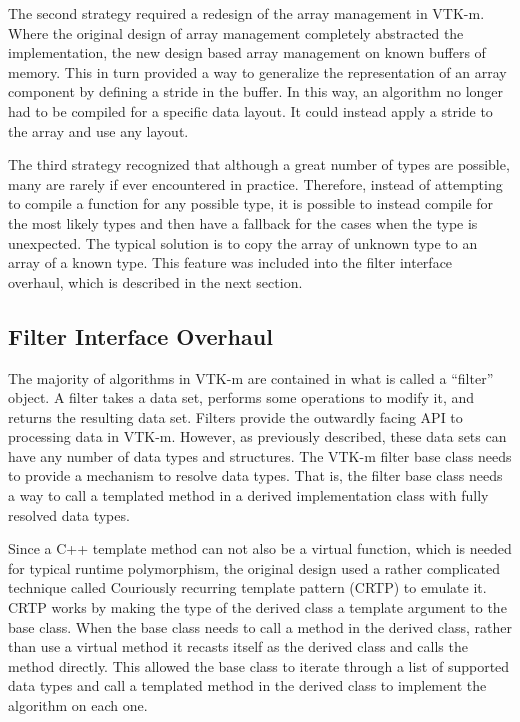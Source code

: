 The second strategy required a redesign of the array management in VTK-m.
Where the original design of array management completely abstracted the implementation, the new design based array management on known buffers of memory.
This in turn provided a way to generalize the representation of an array component by defining a stride in the buffer.
In this way, an algorithm no longer had to be compiled for a specific data layout.
It could instead apply a stride to the array and use any layout.

The third strategy recognized that although a great number of types are possible, many are rarely if ever encountered in practice.
Therefore, instead of attempting to compile a function for any possible type, it is possible to instead compile for the most likely types and then have a fallback for the cases when the type is unexpected.
The typical solution is to copy the array of unknown type to an array of a known type.
This feature was included into the filter interface overhaul, which is described in the next section.

\subsection{Filter Interface Overhaul}


The majority of algorithms in VTK-m are contained in what is called a ``filter'' object.
A filter takes a data set, performs some operations to modify it, and returns the resulting data set.
Filters provide the outwardly facing API to processing data in VTK-m.
However, as previously described, these data sets can have any number of data types and structures.
The VTK-m filter base class needs to provide a mechanism to resolve data types.
That is, the filter base class needs a way to call a templated method in a derived implementation class with fully resolved data types.

Since a C++ template method can not also be a virtual function, which is needed for typical runtime polymorphism, the original design used a rather complicated technique called Couriously recurring template pattern (CRTP) \cite{Coplien1995} to emulate it.
CRTP works by making the type of the derived class a template argument to the base class.
When the base class needs to call a method in the derived class, rather than use a virtual method it recasts itself as the derived class and calls the method directly.
This allowed the base class to iterate through a list of supported data types and call a templated method in the derived class to implement the algorithm on each one.

